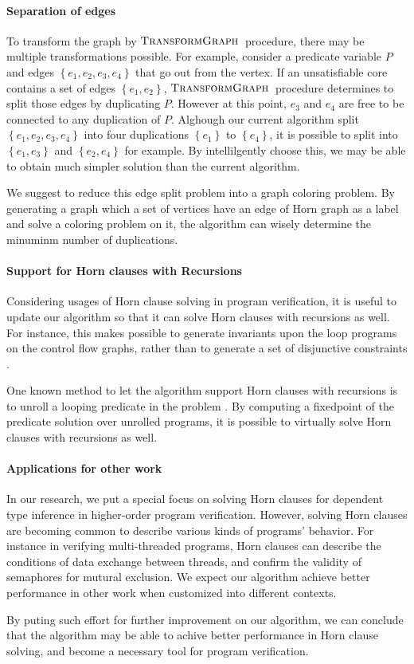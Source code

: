 \paragraph{Separation of edges}
To transform the graph by $\mbox{\sc TransformGraph}$~procedure, there may be
multiple transformations possible.  For example, consider a predicate
variable $P$ and edges $\left\lbrace e_1, e_2, e_3, e_4 \right\rbrace$
that go out from the vertex.  If an unsatisfiable core contains a set
of edges $\left\lbrace e_1, e_2 \right\rbrace$,
$\mbox{\sc TransformGraph}$~procedure determines to split those edges by duplicating
$P$.  However at this point, $e_3$ and $e_4$ are free to be connected
to any duplication of $P$.  Alghough our current algorithm split
$\left\lbrace e_1, e_2, e_3, e_4 \right\rbrace$ into four duplications
$\left\lbrace e_1 \right\rbrace$ to $\left\lbrace e_4 \right\rbrace$,
it is possible to split into $\left\lbrace e_1, e_3\right\rbrace$ and
$\left\lbrace e_2, e_4 \right\rbrace$ for example.  By intellilgently
choose this, we may be able to obtain much simpler solution than the
current algorithm.

We suggest to reduce this edge split problem into a graph coloring
problem.  By generating a graph which a set of vertices have an edge
of Horn graph as a label and solve a coloring problem on it, the
algorithm can wisely determine the minuminm number of duplications.


\paragraph{Support for Horn clauses with Recursions}
Considering usages of Horn clause solving in program verification, it
is useful to update our algorithm so that it can solve Horn clauses
with recursions as well.  For instance, this makes possible to generate
invariants upon the loop programs on the control flow graphs, rather
than to generate a set of disjunctive constraints
\cite{conf/pldi/BeyerHMR07}.

One known method to let the algorithm support Horn clauses with
recursions is to unroll a looping predicate in the problem
\cite{conf/ppdp/UnnoK09}.  By computing a fixedpoint of the predicate
solution over unrolled programs, it is possible to virtually solve
Horn clauses with recursions as well.


\paragraph{Applications for other work}
In our research, we put a special focus on solving Horn clauses for
dependent type inference in higher-order program verification.
However, solving Horn clauses are becoming common to describe various
kinds of programs' behavior.  For instance in verifying multi-threaded
programs, Horn clauses can describe the conditions of data exchange
between threads, and confirm the validity of semaphores for mutural
exclusion.  We expect our algorithm achieve better performance in
other work when customized into different contexts.

By puting such effort for further improvement on our algorithm, we can
conclude that the algorithm may be able to achive better performance
in Horn clause solving, and become a necessary tool for program
verification.
